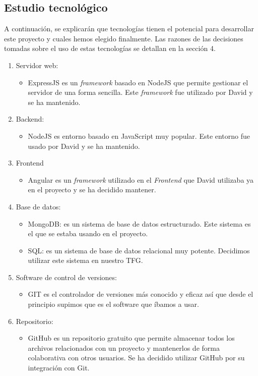 \documentclass[11pt]{article}
\begin{document}
\subsection{Estudio tecnológico}
 A continuación, se explicarán que tecnologías tienen el potencial para desarrollar este proyecto y cuales hemos elegido finalmente. Las razones de las decisiones tomadas sobre el uso de estas tecnologías se detallan en la sección 4.
\begin{enumerate} 
	\item Servidor web:
	\begin{itemize} 
		\item ExpressJS es un \textit{framework} basado en NodeJS que permite gestionar el servidor de una forma sencilla. Este \textit{framework} fue utilizado por David y se ha mantenido.
	\end{itemize}
	\item Backend: 
	\begin{itemize} 
		\item NodeJS es entorno basado en JavaScript muy popular. Este entorno fue usado por David y se ha mantenido.
	\end{itemize}
	\item Frontend
	\begin{itemize} 
		\item Angular es un \textit{framework} utilizado en el \textit{Frontend} que David utilizaba ya en el proyecto y se ha decidido mantener.
	\end{itemize}
	\item Base de datos: 
	\begin{itemize} 
		\item MongoDB: es un sistema de base de datos estructurado. Este sistema es el que se estaba usando en el proyecto.
		\item SQL: es un sistema de base de datos relacional muy potente. Decidimos utilizar este sistema en nuestro TFG.
	\end{itemize}
	\item Software de control de versiones:
	\begin{itemize} 
		\item GIT es el controlador de versiones más conocido y eficaz así que desde el principio supimos que es el software que íbamos a usar. 
	\end{itemize}
	\item Repositorio: 
	\begin{itemize} 
		\item GitHub es un repositorio gratuito que permite almacenar todos los archivos relacionados con un proyecto y mantenerlos de forma colaborativa con otros usuarios. Se ha decidido utilizar GitHub por su integración con Git.

\end{itemize}
\end{enumerate}
\end{document}
